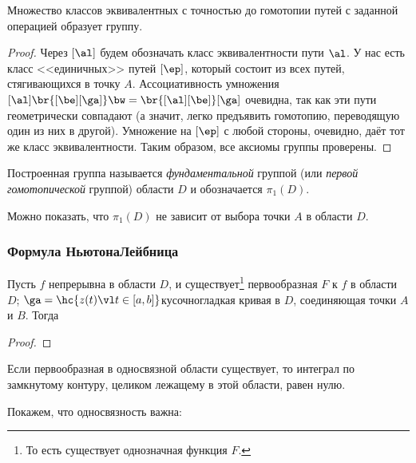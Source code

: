 \documentclass[a4paper]{article}
\begin{document}
\begin{stm}
Множество классов эквивалентных с точностью до гомотопии путей с заданной операцией образует группу.
\end{stm}
\begin{proof}
Через $[\al]$ будем обозначать класс эквивалентности пути $\al$. У нас есть класс <<единичных>> путей
$[\ep]$, который состоит из всех путей, стягивающихся в точку $A$. Ассоциативность умножения
$[\al]\br{[\be][\ga]} \bw= \br{[\al][\be]}[\ga]$ очевидна, так как эти пути геометрически совпадают (а
значит, легко предъявить гомотопию, переводящую один из них в другой). Умножение на $[\ep]$ с любой стороны,
очевидно, даёт тот же класс эквивалентности. Таким образом, все аксиомы группы проверены.
\end{proof}

\begin{df}
Построенная группа называется \emph{фундаментальной} группой (или \emph{первой гомотопической} группой)
области $D$ и обозначается $\pi_1(D)$.
\end{df}

Можно показать, что $\pi_1(D)$ не зависит от выбора точки $A$ в области $D$.


\subsubsection{Формула Ньютона\ч Лейбница}

\begin{theorem}
Пусть $f$ непрерывна в области $D$, и существует\footnote{То есть существует однозначная функция $F$.} первообразная $F$ к $f$ в области $D$;
$\ga=\hc{z(t) \vl t \in [a,b]}$\т кусочно\д гладкая кривая в $D$, соединяющая точки $A$ и $B$.
Тогда
\end{theorem}
\begin{proof}
\hfill\end{proof}
\begin{imp}
Если первообразная в односвязной области существует, то интеграл по замкнутому контуру, целиком лежащему в
этой области, равен нулю.
\end{imp}

\begin{ex}
Покажем, что односвязность важна:
\end{ex}
\end{document}
